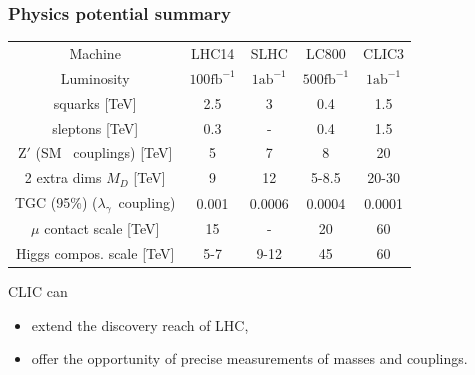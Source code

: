 \documentclass{beamer}
\begin{document}
\begin{frame}
\frametitle{Physics potential summary}
\begin{center}
{\scriptsize
 \begin{tabular}{ ccccc }
    \toprule
 Machine &     LHC14 & SLHC & LC800 & CLIC3\\
 Luminosity & $100\textrm{fb}^{-1}$ & $1\textrm{ab}^{-1}$&
 $500\textrm{fb}^{-1}$& $1\textrm{ab}^{-1}$\\
\midrule
squarks [TeV] &   2.5 & 3 & 0.4 & 1.5 \\
sleptons [TeV] &   0.3 & - & 0.4 & 1.5 \\ 
$\textrm{Z}'$ ({\tiny SM ~couplings}) [TeV]  &  5 & 7 & 8 & 20   \\ 
2 extra dims $M_D$ [TeV]  &    9 & 12 & 5-8.5 & 20-30 \\
TGC (95\%)  ({\tiny \rm $\lambda_{\gamma} $~coupling}) &   0.001& 0.0006& 0.0004& 0.0001 \\
$\mu$ contact scale [TeV] &  15& - & 20 & 60 \\
Higgs compos. scale [TeV] & 5-7 & 9-12 & 45 & 60\\
    \bottomrule
  \end{tabular}
  }
 \end{center}
 CLIC can 
 \begin{itemize}
   \item extend the \alert{discovery reach} of LHC,
   \item offer the opportunity of \alert{precise measurements} of masses and
 couplings.
 \end{itemize}
\end{frame}
\end{document}
